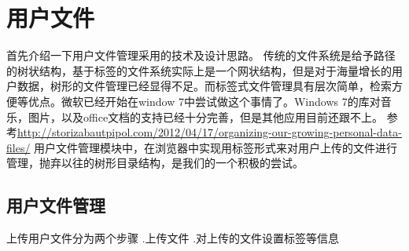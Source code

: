\section{用户文件}
首先介绍一下用户文件管理采用的技术及设计思路。
传统的文件系统是给予路径的树状结构，基于标签的文件系统实际上是一个网状结构，但是对于海量增长的用户数据，树形的文件管理已经显得不足。而标签式文件管理具有层次简单，检索方便等优点。微软已经开始在window
7中尝试做这个事情了。Windows 7的库对音乐，图片，以及office文档的支持已经十分完善，但是其他应用目前还跟不上。
参考\hyperlink{???}{http://storizabautpipol.com/2012/04/17/organizing-{}our-{}growing-{}personal-{}data-{}files/}
用户文件管理模块中，在浏览器中实现用标签形式来对用户上传的文件进行管理，抛弃以往的树形目录结构，是我们的一个积极的尝试。

\subsection{用户文件管理}
上传用户文件分为两个步骤
.上传文件
.对上传的文件设置标签等信息
